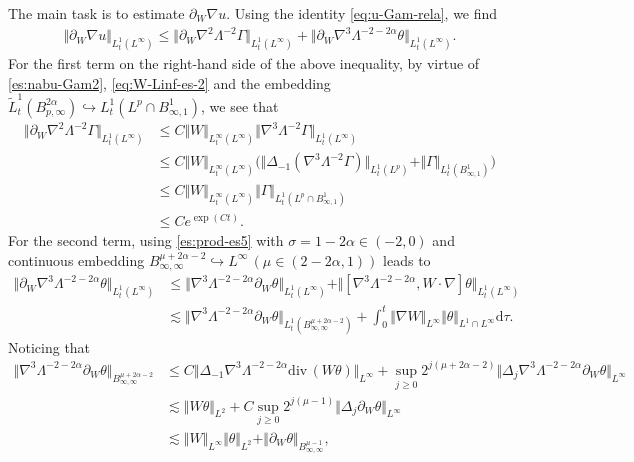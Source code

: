 \documentclass[reqno,11pt,a4paper]{amsart}
\newcommand{\dd}{\mathrm{d}}
\def \p {\partial}
\begin{document}
The main task is to estimate $\partial_W \nabla u$. 
Using the identity \eqref{eq:u-Gam-rela}, we find 
\begin{align}\label{es:parWnabu-Linf}
  \Vert \partial_W \nabla u\Vert _{L^1_t (L^\infty)} 
  \leq \big\Vert \partial_W \nabla^2 \Lambda^{-2} \Gamma\big\Vert _{L^1_t(L^\infty)}
  + \big\Vert \partial_W \nabla^3\Lambda^{-2-2\alpha} \theta \big\Vert _{L^1_t(L^\infty)}.
\end{align}
For the first term on the right-hand side of the above inequality, by virtue of \eqref{es:nabu-Gam2}, \eqref{eq:W-Linf-es-2}
and the embedding $\widetilde{L}^1_t(B^{2\alpha}_{p,\infty})\hookrightarrow L^1_t(L^p\cap B^1_{\infty,1})$, 
we see that
\begin{align}
  \Vert \partial_W\nabla^2 \Lambda^{-2}\Gamma\Vert _{L^1_t(L^\infty)} 
  & \leq C \Vert W\Vert _{L^\infty_t(L^\infty)} 
  \Vert \nabla^3 \Lambda^{-2}\Gamma\Vert _{L^1_t(L^\infty)} \nonumber\\
  & \leq C \Vert W\Vert _{L^\infty_t(L^\infty)} \big(\Vert \Delta_{-1}
  (\nabla^3\Lambda^{-2}\Gamma)\Vert _{L^1_t(L^p)}+ 
  \Vert \Gamma\Vert _{L^1_t(B^1_{\infty,1})}\big) \nonumber\\
  & \leq C \Vert W\Vert _{L^\infty_t(L^\infty)} \Vert \Gamma\Vert _{L^1_t(L^p\cap B^1_{\infty,1})} \nonumber\\
  &\leq Ce^{\exp(Ct)}.\label{es:parWnabu-Linf1}
\end{align}
For the second term, using \eqref{es:prod-es5} with $\sigma= 1-2\alpha \in (-2,0)$ and continuous embedding 
$B^{\mu+2\alpha-2}_{\infty,\infty} \hookrightarrow L^\infty\,(\mu\in(2-2\alpha,1))$
leads to
\begin{align*}
  \big\Vert \partial_W \nabla^3\Lambda^{-2-2\alpha} \theta \big\Vert _{L^1_t(L^\infty)}
  & \leq \Vert \nabla^3\Lambda^{-2-2\alpha} \p_W\theta\Vert _{L_t^1(L^\infty)} 
  + \Vert [\nabla^3\Lambda^{-2-2\alpha}, W\cdot\nabla]\theta\Vert _{L_t^1(L^\infty)} \\
  & \lesssim  \Vert \nabla^3\Lambda^{-2-2\alpha} \p_W\theta\Vert _{L_t^1(B^{\mu+2\alpha-2}_{\infty, \infty})} 
  +  \int_0^t\Vert \nabla W\Vert _{L^\infty}\Vert \theta\Vert _{L^1\cap L^\infty}\dd\tau.
\end{align*}
Noticing that
\begin{align*}
   \Vert \nabla^3\Lambda^{-2-2\alpha} \p_W\theta\Vert _{B^{\mu+2\alpha-2}_{\infty, \infty}} &\leq C \Vert \Delta_{-1}\nabla^3\Lambda^{-2-2\alpha} \mathrm{div}\,(W\theta)\Vert _{L^\infty}  + \sup\limits_{j\geq 0}2^{j(\mu+2\alpha-2)}
  \Vert \Delta_j \nabla^3\Lambda^{-2-2\alpha} \p_W\theta\Vert _{L^\infty} \\
  & \lesssim \Vert  W\theta\Vert _{L^2} 
  + C\sup\limits_{j\geq 0}2^{j(\mu-1)}\Vert \Delta_j \p_W\theta\Vert _{L^\infty} \\
  &\lesssim \Vert W\Vert _{L^\infty}\Vert \theta\Vert _{L^2}+ \Vert \p_W\theta\Vert _{B^{\mu-1}_{\infty,\infty}},
\end{align*}
\end{document}
